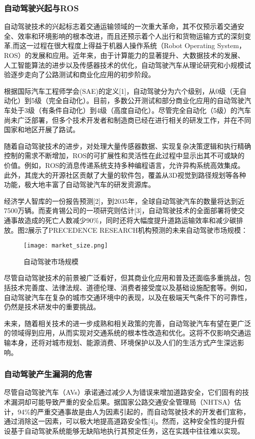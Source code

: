 \subsubsection{自动驾驶兴起与ROS}
自动驾驶技术的兴起标志着交通运输领域的一次重大革命，其不仅预示着交通安全、效率和环境影响的根本改进，而且还预示着个人出行和货物运输方式的深刻变革,而这一过程在很大程度上得益于机器人操作系统（Robot Operating System，ROS）的发展和应用。近年来，由于计算能力的显著提升、大数据技术的发展、人工智能算法的进步以及传感器技术的优化，自动驾驶汽车从理论研究和小规模试验逐步走向了公路测试和商业化应用的初步阶段。

根据国际汽车工程师学会(SAE)的定义[1]，自动驾驶分为六个级别，从0级（无自动化）到5级（完全自动化）。目前，多数公开测试和部分商业化应用的自动驾驶汽车处于3级（有条件自动化）到4级（高度自动化）。尽管完全自动化（5级）的汽车尚未广泛部署，但多个技术开发者和制造商已经在进行相关的研发工作，并在不同国家和地区开展了路试。

随着自动驾驶技术的进步，对处理大量传感器数据、实现复杂决策逻辑和执行精确控制的需求不断增加，ROS的可扩展性和灵活性在此过程中显示出其不可或缺的价值。例如，ROS的消息传递系统支持多种编程语言，允许异构系统高效集成。此外，其庞大的开源社区贡献了大量的软件包，覆盖从3D视觉到路径规划等各种功能，极大地丰富了自动驾驶汽车的研发资源库。

经济学人智库的一份报告预测[2]，到2035年，全球自动驾驶汽车的数量将达到近7500万辆。而麦肯锡公司的一项研究则估计[3]，自动驾驶技术的全面部署将使交通事故造成的死亡人数减少90\%，同时还将大幅度提升道路运输效率和减少碳排放。图2展示了PRECEDENCE RESEARCH机构预测的未来自动驾驶市场规模：

\begin{figure}[H]
  \centering
  \texttt{[image: market\_size.png]}
  \caption{自动驾驶市场规模}
  \label{fig:my_label}
\end{figure}

尽管自动驾驶技术的前景被广泛看好，但其商业化应用和普及还面临多重挑战，包括技术完善度、法律法规、道德伦理、消费者接受度以及基础设施配套等。例如，自动驾驶汽车在复杂的城市交通环境中的表现，以及在极端天气条件下的可靠性，仍然是技术研发中的重要挑战。

未来，随着相关技术的进一步成熟和相关政策的完善，自动驾驶汽车有望在更广泛的领域得到应用，从而实现对交通系统的根本性改造和优化。这将不仅影响交通运输本身，还将对城市规划、能源消费、环境保护以及人们的生活方式产生深远影响。

\subsubsection{自动驾驶产生漏洞的危害}
尽管自动驾驶汽车（AVs）承诺通过减少人为错误来增加道路安全，它们固有的技术漏洞却可能导致严重的安全后果。据国家公路交通安全管理局（NHTSA）估计，94\%的严重交通事故是由人为因素引起的，而自动驾驶技术的开发者们宣称，通过消除这一因素，可以极大地提高道路安全性[4]。然而，这种安全性的提升假设基于自动驾驶系统能够无缺陷地执行其预定任务，这在实践中往往难以实现。

